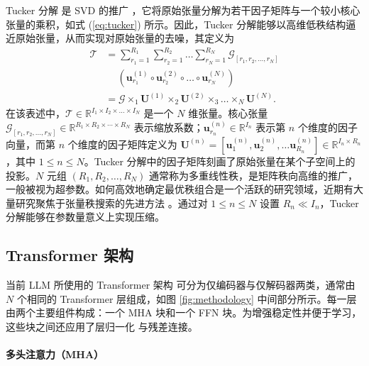 \documentclass[conference]{IEEEtran}
\begin{document}
Tucker 分解 \cite{tucker1966some} 是 SVD 的推广 \cite{de2000multilinear, vasilescu2002multilinear}，它将原始张量分解为若干因子矩阵与一个较小核心张量的乘积，如式 (\ref{eq:tucker}) 所示。因此，Tucker 分解能够以高维低秩结构逼近原始张量，从而实现对原始张量的去噪，其定义为
\begin{equation}
\begin{split}
    \mathcal{T} &= \sum_{r_1=1}^{R_1} \sum_{r_2=1}^{R_2} \dots \sum_{r_N=1}^{R_N} \mathcal{G}_{[r_1, r_2, \dots, r_N]} \\
    & \quad \ \left(\mathbf{u}^{(1)}_{r_1} \circ \mathbf{u}_{r_2}^{(2)} \circ \dots \circ \mathbf{u}_{r_N}^{(N)} \right)\\
    &= \mathcal{G} \times_1 \mathbf{U}^{(1)} \times_2 \mathbf{U}^{(2)} \times_3 \dots \times_N \mathbf{U}^{(N)}.
\end{split}
\label{eq:tucker}
\end{equation}
在该表述中，$\mathcal{T} \in \mathbb{R}^{I_1 \times I_2 \times \dots \times I_N}$ 是一个 $N$ 维张量。核心张量 $\mathcal{G}_{[r_1, r_2, \dots, r_N]} \in \mathbb{R}^{R_1 \times R_2 \times \cdots \times R_N}$ 表示缩放系数；$\mathbf{u}_{r_n}^{(n)} \in \mathbb{R}^{I_n}$ 表示第 $n$ 个维度的因子向量，而第 $n$ 个维度的因子矩阵定义为 $\mathbf{U}^{(n)} = \left[ \mathbf{u}_1^{(n)}, \mathbf{u}_2^{(n)}, \dots \mathbf{u}_{R_n}^{(n)} \right] \in \mathbb{R}^{I_n \times R_n}$，其中 $1\leq n \leq N$。Tucker 分解中的因子矩阵刻画了原始张量在某个子空间上的投影。$N$ 元组 $(R_1, R_2, \dots, R_N)$ 通常称为多重线性秩，是矩阵秩向高维的推广，一般被视为超参数。如何高效地确定最优秩组合是一个活跃的研究领域，近期有大量研究聚焦于张量秩搜索的先进方法 \cite{iacovides2024towards, 10655696}。通过对 $1\leq n \leq N$ 设置 $R_n \ll I_n$，Tucker 分解能够在参数量意义上实现压缩。

\subsection{Transformer 架构}
当前 LLM 所使用的 Transformer 架构 \cite{vaswani2017attention} 可分为仅编码器与仅解码器两类，通常由 $N$ 个相同的 Transformer 层组成，如图 \ref{fig:methodology} 中间部分所示。每一层由两个主要组件构成：一个 MHA 块和一个 FFN 块。为增强稳定性并便于学习，这些块之间还应用了层归一化 \cite{lei2016layer} 与残差连接。

\paragraph{多头注意力（MHA）}
\end{document}
